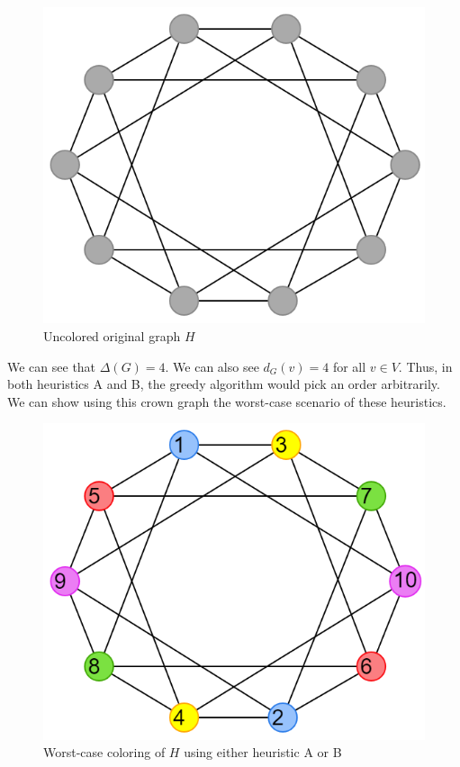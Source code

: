 \documentclass{article}
\begin{document}
\begin{figure}[H]
\centering
\includegraphics[scale=0.38]{images/graph-4.png}
\caption{Uncolored original graph \(H\)}
\end{figure}

We can see that \(\Delta(G) = 4\). We can also see \(d_G(v) = 4\) for all \(v \in V\). Thus, in both heuristics A and B, the greedy algorithm would pick an order arbitrarily. We can show using this crown graph the worst-case scenario of these heuristics.

\begin{figure}[H]
\centering
\includegraphics[scale=0.38]{images/graph-5.png}
\caption{Worst-case coloring of \(H\) using either heuristic A or B}
\end{figure}
\end{document}
